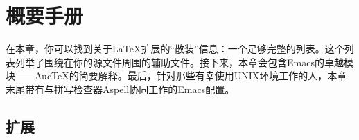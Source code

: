 \chapter{概要手册}

在本章，你可以找到关于\LaTeX 扩展的“散装”信息：一个足够完整的列表。这个列表列举了围绕在你的源文件周围的辅助文件。接下来，本章会包含\textsf{Emacs}的卓越模块——Auc\TeX 的简要解释。最后，针对那些有幸使用UNIX环境工作的人，本章末尾带有与拼写检查器\textsf{Aspell}协同工作的\textsf{Emacs}配置。

\section{扩展}

